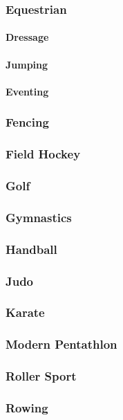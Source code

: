 			\subsubsection{Equestrian}
				\paragraph{Dressage}
				\paragraph{Jumping}
				\paragraph{Eventing}
			\subsubsection{Fencing}
			\subsubsection{Field Hockey}
			\subsubsection{Golf}
			\subsubsection{Gymnastics}
			\subsubsection{Handball}
			\subsubsection{Judo}
			\subsubsection{Karate}
			\subsubsection{Modern Pentathlon}
			\subsubsection{Roller Sport}
			\subsubsection{Rowing}
